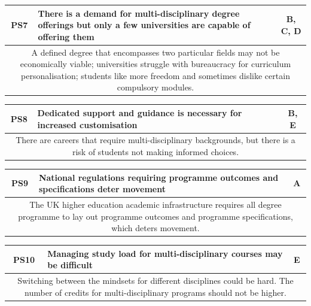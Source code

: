 \begin{table}[!ht]
	\begin{tabularx}{\textwidth}{|c|X|c|}
		\hline
		PS7                                        & \textbf{There is a demand for multi-disciplinary degree offerings but only a few
		universities are capable of offering them} & B, C, D                                                                          \\
		\hline
		\multicolumn{3}{|X|}{A defined degree that encompasses two particular fields may not be economically viable;
			universities struggle with bureaucracy for curriculum personalisation;
			students like more freedom and sometimes dislike certain compulsory modules.}                                                 \\
		\hline
	\end{tabularx}
\end{table}
\begin{table}[!ht]
	\begin{tabularx}{\textwidth}{|c|X|c|}
		\hline
		PS8 & \textbf{Dedicated support and guidance is necessary for increased customisation} & B, E \\
		\hline
		\multicolumn{3}{|X|}{There are careers that require multi-disciplinary backgrounds, but there is a risk of
			students not making informed choices.}                                                        \\
		\hline
	\end{tabularx}
\end{table}
\begin{table}[!ht]
	\begin{tabularx}{\textwidth}{|c|X|c|}
		\hline
		PS9 & \textbf{National regulations requiring programme outcomes and specifications deter movement} & A \\
		\hline
		\multicolumn{3}{|X|}{The UK higher education academic infrastructure requires all degree programme to lay out
			programme outcomes and programme specifications, which deters movement.}                               \\
		\hline
	\end{tabularx}
\end{table}
\begin{table}[!ht]
	\begin{tabularx}{\textwidth}{|c|X|c|}
		\hline
		PS10 & \textbf{Managing study load for multi-disciplinary courses may be difficult} & E \\
		\hline
		\multicolumn{3}{|X|}{Switching between the mindsets for different disciplines could be hard.
			The number of credits for multi-disciplinary programs should not be higher.}            \\
		\hline
	\end{tabularx}
\end{table}

